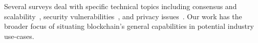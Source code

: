 Several surveys deal with specific technical topics including consensus and scalability~\cite{Gervais16,Croman16,Bano17,garay2018consensus}, security vulnerabilities~\cite{Conti17}, and privacy issues~\cite{Henry18}. Our work has the broader focus of situating blockchain's general capabilities in potential industry use-cases. 




